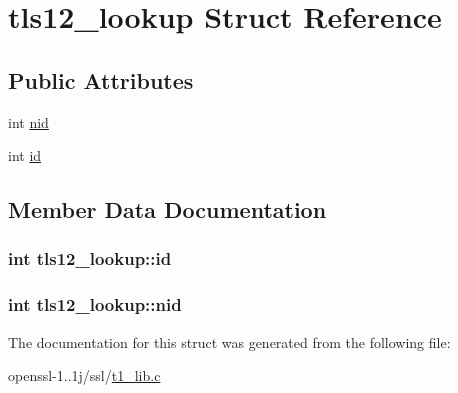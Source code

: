 \hypertarget{structtls12__lookup}{\section{tls12\-\_\-lookup Struct Reference}
\label{structtls12__lookup}
}
\subsection*{Public Attributes}
\begin{DoxyCompactItemize}
\item 
int \hyperlink{structtls12__lookup_abcf57a095310afcb34726eb2b1a308a3}{nid}
\item 
int \hyperlink{structtls12__lookup_ac1d4673f49196f7a1d7ac605ec208953}{id}
\end{DoxyCompactItemize}


\subsection{Member Data Documentation}
\hypertarget{structtls12__lookup_ac1d4673f49196f7a1d7ac605ec208953}{
\subsubsection[{id}]{\setlength{\rightskip}{0pt plus 5cm}int tls12\-\_\-lookup\-::id}}\label{structtls12__lookup_ac1d4673f49196f7a1d7ac605ec208953}
\hypertarget{structtls12__lookup_abcf57a095310afcb34726eb2b1a308a3}{
\subsubsection[{nid}]{\setlength{\rightskip}{0pt plus 5cm}int tls12\-\_\-lookup\-::nid}}\label{structtls12__lookup_abcf57a095310afcb34726eb2b1a308a3}


The documentation for this struct was generated from the following file\-:\begin{DoxyCompactItemize}
\item 
openssl-\/1..\-1j/ssl/\hyperlink{t1__lib_8c}{t1\-\_\-lib.\-c}\end{DoxyCompactItemize}
